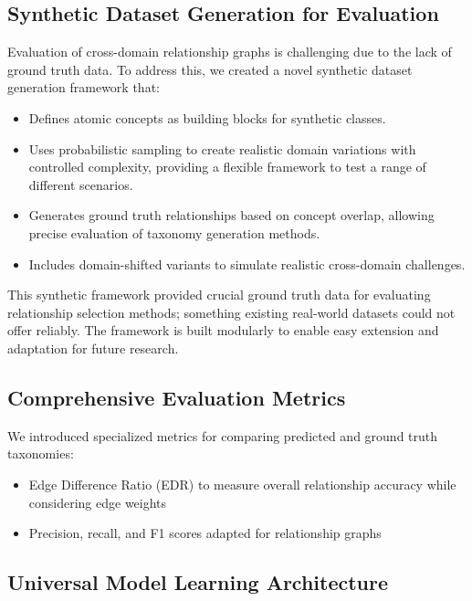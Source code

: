 \subsection{Synthetic Dataset Generation for Evaluation}

Evaluation of cross-domain relationship graphs is challenging due to the lack of ground truth data.
To address this, we created a novel synthetic dataset generation framework that:

\begin{itemize}
      \item Defines atomic concepts as building blocks for synthetic classes.
      \item Uses probabilistic sampling to create realistic domain variations
            with controlled complexity,
            providing a flexible framework to test a range of different scenarios.
      \item Generates ground truth relationships based on concept overlap,
            allowing precise evaluation of taxonomy generation methods.
      \item Includes domain-shifted variants to simulate realistic cross-domain challenges.
\end{itemize}

This synthetic framework provided crucial ground truth data for evaluating relationship selection methods;
something existing real-world datasets could not offer reliably.
The framework is built modularly to enable easy extension and adaptation for future research.

\subsection{Comprehensive Evaluation Metrics}

We introduced specialized metrics for comparing predicted and ground truth taxonomies:

\begin{itemize}
      \item Edge Difference Ratio (EDR) to measure overall relationship accuracy
            while considering edge weights
      \item Precision, recall, and F1 scores adapted for relationship graphs
\end{itemize}

\subsection{Universal Model Learning Architecture}

